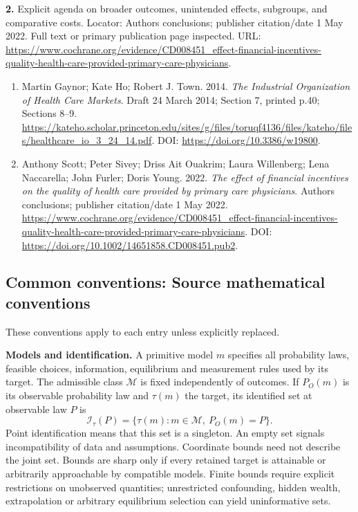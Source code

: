 \documentclass[11pt,a4paper]{article}
\begin{document}
\textbf{2.} Explicit agenda on broader outcomes, unintended effects, subgroups, and comparative costs. Locator: Authors conclusions; publisher citation/date 1 May 2022. Full text or primary publication page inspected. URL: \url{https://www.cochrane.org/evidence/CD008451_effect-financial-incentives-quality-health-care-provided-primary-care-physicians}.
\begin{enumerate}\raggedright
\item\hypertarget{definitions:source:30007725:1}{} Martin Gaynor; Kate Ho; Robert J. Town. 2014. \emph{The Industrial Organization of Health Care Markets}. Draft 24 March 2014; Section 7, printed p.40; Sections 8–9.
\url{https://kateho.scholar.princeton.edu/sites/g/files/toruqf4136/files/kateho/files/healthcare_io_3_24_14.pdf}.
DOI: \url{https://doi.org/10.3386/w19800}.
\item\hypertarget{definitions:source:30007725:2}{} Anthony Scott; Peter Sivey; Driss Ait Ouakrim; Laura Willenberg; Lena Naccarella; John Furler; Doris Young. 2022. \emph{The effect of financial incentives on the quality of health care provided by primary care physicians}. Authors conclusions; publisher citation/date 1 May 2022.
\url{https://www.cochrane.org/evidence/CD008451_effect-financial-incentives-quality-health-care-provided-primary-care-physicians}.
DOI: \url{https://doi.org/10.1002/14651858.CD008451.pub2}.
\end{enumerate}

\subsection*{Common conventions: Source mathematical conventions}

These conventions apply to each entry unless explicitly replaced.

\textbf{Models and identification.} A primitive model \(m\) specifies all probability laws, feasible choices, information, equilibrium and measurement rules used by its target. The admissible class \(\mathcal M\) is fixed independently of outcomes. If \(P_O(m)\) is its observable probability law and \(\tau(m)\) the target, its identified set at observable law \(P\) is
\[
 \mathcal I_\tau(P)=\{\tau(m):m\in\mathcal M,\ P_O(m)=P\}.
\]
Point identification means that this set is a singleton. An empty set signals incompatibility of data and assumptions. Coordinate bounds need not describe the joint set. Bounds are sharp only if every retained target is attainable or arbitrarily approachable by compatible models. Finite bounds require explicit restrictions on unobserved quantities; unrestricted confounding, hidden wealth, extrapolation or arbitrary equilibrium selection can yield uninformative sets.
\end{document}
